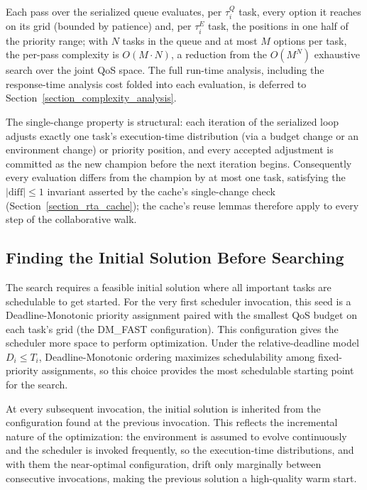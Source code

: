     Each pass over the serialized queue evaluates, per $\tau^Q_i$ task, every option it reaches on its grid (bounded by patience) and, per $\tau^E_i$ task, the positions in one half of the priority range; with $N$ tasks in the queue and at most $M$ options per task, the per-pass complexity is $O(M \cdot N)$, a reduction from the $O(M^N)$ exhaustive search over the joint QoS space.
    The full run-time analysis, including the response-time analysis cost folded into each evaluation, is deferred to Section~\ref{section_complexity_analysis}.

    The single-change property is structural: each iteration of the serialized loop adjusts exactly one task's execution-time distribution (via a budget change or an environment change) or priority position, and every accepted adjustment is committed as the new champion before the next iteration begins.
    Consequently every evaluation differs from the champion by at most one task, satisfying the $|\mathrm{diff}| \leq 1$ invariant asserted by the cache's single-change check (Section~\ref{section_rta_cache}); the cache's reuse lemmas therefore apply to every step of the collaborative walk.

    \subsection{Finding the Initial Solution Before Searching}
    \label{section_initial_solution}

    The search requires a feasible initial solution where all important tasks are schedulable to get started.
    For the very first scheduler invocation, this seed is a Deadline-Monotonic priority assignment paired with the smallest QoS budget on each task's grid (the DM\_FAST configuration).
    This configuration gives the scheduler more space to perform optimization.
    Under the relative-deadline model $D_i \le T_i$, Deadline-Monotonic ordering maximizes schedulability among fixed-priority assignments, so this choice provides the most schedulable starting point for the search.

    At every subsequent invocation, the initial solution is inherited from the configuration found at the previous invocation.
    This reflects the incremental nature of the optimization: the environment is assumed to evolve continuously and the scheduler is invoked frequently, 
    so the execution-time distributions, and with them the near-optimal configuration, drift only marginally between consecutive invocations, making the previous solution a high-quality warm start.

